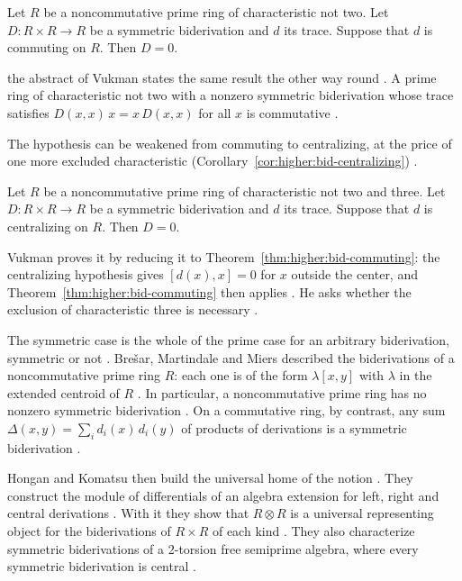 \begin{theorem}\label{thm:higher:bid-commuting}
Let $R$ be a noncommutative prime ring of characteristic not two. Let
$D\colon R\times R\to R$ be a symmetric biderivation and $d$ its trace.
Suppose that $d$ is commuting on $R$. Then $D=0$.
\end{theorem}

the abstract of Vukman states the same result the other way round
\cite[p.~245]{Vukman1989Bid}. A prime ring of characteristic not two with a
nonzero symmetric biderivation whose trace satisfies $D(x,x)\,x=x\,D(x,x)$
for all $x$ is commutative \cite[p.~245]{Vukman1989Bid}.

The hypothesis can be weakened from commuting to centralizing, at the price of
one more excluded characteristic (Corollary~\ref{cor:higher:bid-centralizing})
\cite[p.~249]{Vukman1989Bid}.

\begin{corollary}\label{cor:higher:bid-centralizing}
Let $R$ be a noncommutative prime ring of characteristic not two and three.
Let $D\colon R\times R\to R$ be a symmetric biderivation and $d$ its trace.
Suppose that $d$ is centralizing on $R$. Then $D=0$.
\end{corollary}

Vukman proves it by reducing it to Theorem~\ref{thm:higher:bid-commuting}:
the centralizing hypothesis gives $[d(x),x]=0$ for $x$ outside the center,
and Theorem~\ref{thm:higher:bid-commuting} then applies
\cite[p.~250]{Vukman1989Bid}. He asks whether the exclusion of
characteristic three is necessary \cite[p.~250]{Vukman1989Bid}.

The symmetric case is the whole of the prime case for an arbitrary
biderivation, symmetric or not \cite[p.~669]{HonganKomatsu2000}. Brešar,
Martindale and Miers described the biderivations of a noncommutative prime
ring $R$: each one is of the form $\lambda[x,y]$ with $\lambda$ in the
extended centroid of $R$ \cite[reference~1]{BresarMartindaleMiers1993}. In
particular, a noncommutative prime ring has no nonzero symmetric biderivation
\cite[p.~669]{HonganKomatsu2000}. On a commutative ring, by contrast, any
sum $\Delta(x,y)=\sum_{i} d_i(x)\,d_i(y)$ of products of derivations is a
symmetric biderivation \cite[p.~669]{HonganKomatsu2000}.

Hongan and Komatsu then build the universal home of the notion
\cite[p.~670]{HonganKomatsu2000}. They construct the module of differentials
of an algebra extension for left, right and central derivations
\cite[p.~670]{HonganKomatsu2000}. With it they show that $R\otimes R$ is a
universal representing object for the biderivations of $R\times R$ of each
kind \cite[p.~671]{HonganKomatsu2000}. They also characterize symmetric
biderivations of a 2-torsion free semiprime algebra, where every symmetric
biderivation is central \cite[p.~671]{HonganKomatsu2000}.

